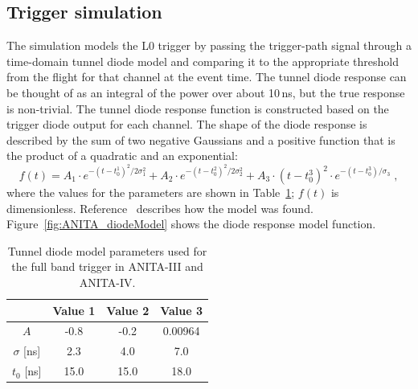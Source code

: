 


\subsection{Trigger simulation}
\label{subsec:ANITA_trigger}
The simulation models the L0 trigger by passing the
trigger-path signal through a time-domain tunnel diode model and comparing it to the
appropriate threshold from the flight for that channel at the event
time.
The tunnel diode response can be thought of as an integral of the power over about 10\,ns, but the true response is non-trivial.
The tunnel diode response function is constructed based on the trigger diode output for each channel.
The shape of the diode response is described by the sum of two negative Gaussians and a positive function that is the product of a quadratic and an exponential:
\begin{equation}
      f(t) = A_1 \cdot e^{-(t-t_0^1)^2/2\sigma_1^2} + 
      A_2 \cdot e^{-(t-t_0^2)^2/2\sigma_2^2} +
      A_3 \cdot \left( t-t_0^3 \right)^2 \cdot
      e^{-(t-t_0^3)/\sigma_3} \;,
    \end{equation}
\noindent where the values for the parameters are shown in
Table~\ref{tab:diodeModelParameters};
$f(t)$ is dimensionless.
Reference~\cite{diodeModel} describes how the model was found. Figure~\ref{fig:ANITA_diodeModel} shows the diode response model function.

\begin{table}[h!]
\caption{Tunnel diode model parameters used for the full band trigger in ANITA-III and ANITA-IV.}
  \begin{center}
    \begin{tabular}{c|c|c|c} 
      & Value 1 & Value 2 & Value 3 \\
     \hline
      $A$           & -0.8  & -0.2   &  0.00964   \\
      $\sigma$ [ns] &  2.3  &  4.0   &  7.0       \\ 
      $t_0$  [ns]   & 15.0  & 15.0   & 18.0       \\
    \end{tabular}
  \end{center}
  \label{tab:diodeModelParameters}
\end{table}


